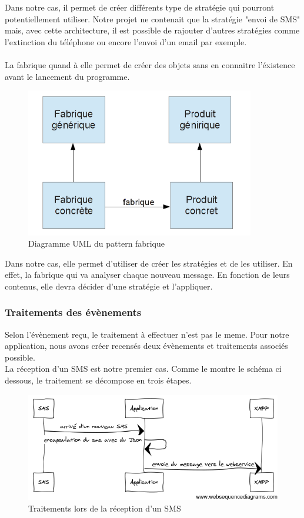 Dans notre cas, il permet de créer différents type de stratégie qui pourront potentiellement utiliser. 
Notre projet ne contenait que la stratégie "envoi de SMS" mais, avec cette architecture, il est possible 
de rajouter d'autres stratégies comme l'extinction du téléphone ou encore l'envoi d'un email par exemple.
\\\\

La fabrique quand à elle permet de créer des objets sans en connaitre l'éxistence avant le lancement du 
programme.

\begin{figure}[H]
	\center
	\includegraphics[width=10cm]{img/fabrique.png}
	\caption{Diagramme UML du pattern fabrique}
\end{figure}

Dans notre cas, elle permet d'utiliser de créer les stratégies et de les utiliser. En effet, la fabrique 
qui va analyser chaque nouveau message. En fonction de leurs contenus, elle devra décider d'une stratégie
et l'appliquer.


\subsubsection{Traitements des évènements}

Selon l'évènement reçu, le traitement à effectuer n'est pas le meme. Pour notre application, nous avons 
créer recensés deux évènements et traitements associés possible.
\\
La réception d'un SMS est notre premier cas. Comme le montre le schéma ci dessous, le traitement se 
décompose en trois étapes. 

\begin{figure}[!h]
	\center
	\includegraphics[width=12cm]{img/encapsulation-sms.png}
	\caption{Traitements lors de la réception d'un SMS}
\end{figure}

